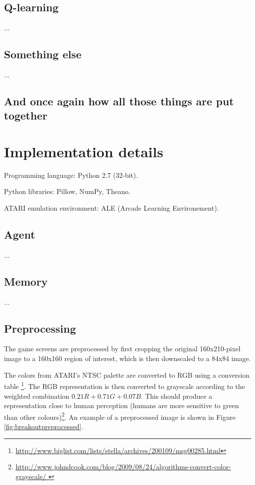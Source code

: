 \documentclass[a4paper,12pt]{article}
\begin{document}
\subsection{Q-learning}
...

\subsection{Something else}
...


\subsection{And once again how all those things are put together}



%
%
\pagebreak
\section{Implementation details}
Programming language: Python 2.7 (32-bit).

Python libraries: Pillow, NumPy, Theano.

ATARI emulation environment: ALE (Arcade Learning Environement).

\subsection{Agent}
...

\subsection{Memory}
...

\subsection{Preprocessing}
\label{subsection_preproc}
The game screens are preprocessed by first cropping the original 160x210-pixel image to a 160x160 region of interest, which is then downscaled to a 84x84 image.

The colors from ATARI's NTSC palette are converted to RGB using a conversion table
\footnote{\url{http://www.biglist.com/lists/stella/archives/200109/msg00285.html}}. The RGB representation is then converted to grayscale according to the weighted combination $0.21R + 0.71G + 0.07B$. This should produce a representation close to human perception (humans are more sensitive to green than other colours)\footnote{\url{http://www.johndcook.com/blog/2009/08/24/algorithms-convert-color-grayscale/
}}. An example of a preprocessed image is shown in Figure \ref{fig:breakoutpreprocessed}.
\end{document}
